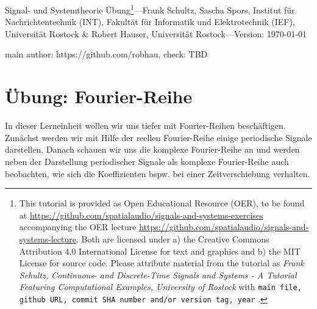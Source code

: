 \documentclass[11pt,a4paper,DIV=12]{scrartcl}
\begin{document}
\noindent Signal- und Systemtheorie Übung\footnote{This tutorial is provided as
Open Educational Resource (OER), to be found at
\url{https://github.com/spatialaudio/signals-and-systems-exercises}
accompanying the OER lecture
\url{https://github.com/spatialaudio/signals-and-systems-lecture}.
%
Both are licensed under a) the Creative Commons Attribution 4.0 International
License for text and graphics and b) the MIT License for source code.
%
Please attribute material from the tutorial as \textit{Frank Schultz,
Continuous- and Discrete-Time Signals and Systems - A Tutorial Featuring
Computational Examples, University of Rostock} with
\texttt{main file, github URL, commit SHA number and/or version tag, year}
.}---Frank Schultz, Sascha Spors,
Institut für Nachrichtentechnik (INT),
Fakultät für Informatik und Elektrotechnik (IEF),
Universität Rostock \&
Robert Hauser, Universität Rostock---Version: \today

\noindent main author: https://github.com/robhau, check: TBD

\section*{Übung: Fourier-Reihe}
\begin{Ziel}
	In dieser Lerneinheit wollen wir uns tiefer mit Fourier-Reihen beschäftigen. Zunächst werden wir mit Hilfe der reellen Fourier-Reihe einige periodische Signale darstellen.
	Danach schauen wir uns die komplexe Fourier-Reihe an und werden neben der Darstellung periodischer Signale als komplexe Fourier-Reihe auch beobachten, wie sich die Koeffizienten bspw. bei einer Zeitverschiebung verhalten.
\end{Ziel}
\end{document}
